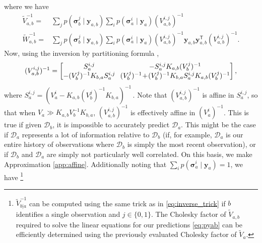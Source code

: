 \documentclass{article} %
\newcommand{\given}{\!\ensuremath{\mid}\!}
\newcommand{\cm}[1]{\ensuremath{\mathcal{#1}}}
\newcommand{\bm}[1]{\ensuremath{\mathbf{#1}}}
\newcommand{\data}{\ensuremath{\cm{D}}}
\newcommand{\vect}[1]{\bm{#1}}
\newcommand{\vy}{\vect{y}}
\newcommand{\vs}{\vect{\sigma}}
\newcommand{\amean}[2]{\tilde{{m}}(#1 \given #2 )}
\newcommand{\acov}[2]{\tilde{{C}}(#1 \given #2 )}
\newcommand{\fPr}{p}
\newcommand{\Prob}[2]{\fPr(#1 \given #2 )}
\newcommand{\st}{_{\star}}
\newcommand{\tr}{\ensuremath{\mathsf{T}}}
\newcommand{\defequal}{=}
\begin{document}
where we have
\begin{align*}
\tilde{V}^{-1}_{a,b} \defequal {} &
\sum_{j} \Prob{\vs^j_{b}}{\vy_{a,b}}\sum_i \Prob{\vs^i_{a}}{\vy_{a}} (V_{a,b}^{i,j})^{-1} \\
\tilde{W}^{-1}_{a,b} \defequal {} &
\sum_{j} \Prob{\vs^j_{b}}{\vy_{a,b}}\sum_i \Prob{\vs^i_{a}}{\vy_{a}} (V_{a,b}^{i,j})^{-1}  
 \vy_{a,b}^{\phantom{\tr}} \vy_{a,b}^\tr (V_{a,b}^{i,j})^{-1}.
\end{align*}
Now, using the inversion by partitioning formula \citep[Section 2.7]
{NumericalRecipes},
\begin{align*}
({V}^{i,j}_{a,b})^{-1} =
\begin{bmatrix}
 S^{i,j}_a &\hspace{-0.1cm} -S^{i,j}_a K_{a,b} (V^j_b)^{-1} \\
 - (V^j_b)^{-1} K_{b,a} S^{i,j}_a &\hspace{-0.1cm} (V^j_b)^{-1}\!+\!(V^j_b)^{-1} K_{b,a} S^{i,j}_a K_{a,b} (V^j_b)^{-1} 
\end{bmatrix},
\end{align*}
where
$
S^{i,j}_a \defequal (V^i_a -K_{a,b} (V^j_b)^{-1}K_{b,a})^{-1}\,.
$ Note that $({V}^{i,j}_{a,b})^{-1}$ is affine in $S^{i,j}_a$, so that when $V_a \gg K_{a,b} V_b^{-1} K_{b,a}$,
$({V}^{i,j}_{a,b})^{-1}$ is effectively affine in $(V^i_a)^{-1}$. This
is true if given $\data_b$, it is impossible to accurately predict
$\data_a$. This might be the case if $\data_a$ represents a lot of
information relative to $\data_b$ (if, for example, $\data_a$ is our
entire history of observations where $\data_b$ is simply the most
recent observation), or if $\data_b$ and $\data_a$ are simply not
particularly well correlated. On this basis, we make Approximation \ref{app:affine}. Additionally noting that $\sum_i \Prob{\vs^i_{a}}{\vy_{a}} = 1$, we have
\footnote{
$\tilde{V}^{-1}_{b|a}$ can be computed using the same trick as in \eqref{eq:inverse_trick} if
$b$ identifies a single observation and $j\in\{0,1\}$. The Cholesky factor of $\tilde{V}_{a,b}$ required to solve the linear equations for our predictions \eqref{eq:pyab} can be efficiently determined \citep[Appendix
  B]{osbornebayesian} using the previously evaluated Cholesky factor of $\tilde{V}_{a}$.
}
\end{document}
